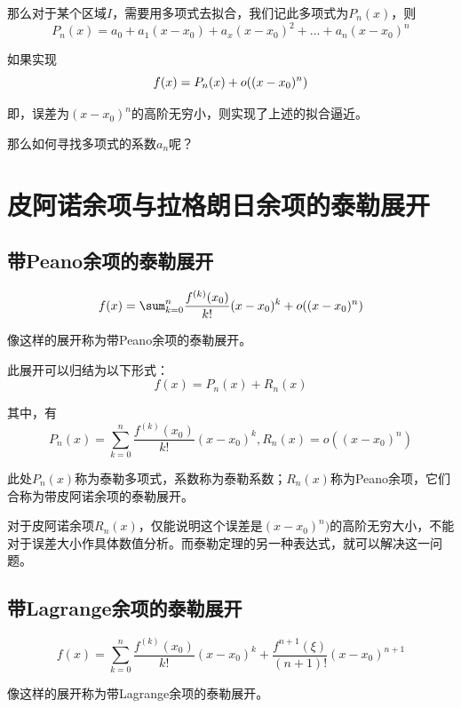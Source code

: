 那么对于某个区域$I$，需要用多项式去拟合，我们记此多项式为$P_n(x)$，则
\begin{equation}
	P_n(x)=a_0+a_1(x-x_0)+a_x(x-x_0)^2+...+a_n(x-x_0)^n\label{eq:5.2}
\end{equation}

如果实现
\begin{equation*}
	f(x)=P_n(x)+o\qty((x-x_0)^n)
\end{equation*}

即，误差为$(x-x_0)^n$的高阶无穷小，则实现了上述的拟合逼近。

那么如何寻找多项式的系数$a_n$呢？

\section{皮阿诺余项与拉格朗日余项的泰勒展开}

\subsection{带Peano余项的泰勒展开}
\begin{definition}
	\begin{equation}
		f(x)=\sum_{k=0}^n\frac{f^{(k)}(x_0)}{k!}(x-x_0)^k+o\qty((x-x_0)^n)\label{eq:5.3}
	\end{equation}

    像这样的展开称为带Peano余项的泰勒展开。
\end{definition}

此展开可以归结为以下形式：
$$
	f(x)=P_n(x)+R_n(x)
$$

其中，有
$$
P_n(x)=\sum\limits_{k=0}^n\frac{f^{(k)}(x_0)}{k!}(x-x_0)^k,R_n(x)=o((x-x_0)^n)
$$

此处$P_n(x)$称为泰勒多项式，系数称为泰勒系数；$R_n(x)$称为Peano余项，它们合称为带皮阿诺余项的泰勒展开。

\begin{remark}
	对于皮阿诺余项$R_n(x)$，仅能说明这个误差是$(x-x_0)^n)$的高阶无穷大小，不能对于误差大小作具体数值分析。而泰勒定理的另一种表达式，就可以解决这一问题。
\end{remark}

\subsection{带Lagrange余项的泰勒展开}\label{sec:5.2.2}

\begin{definition}
	\begin{equation}
		f(x)=\sum_{k=0}^n\frac{f^{(k)}(x_0)}{k!}(x-x_0)^k+\frac{f^{n+1}(\xi)}{(n+1)!}(x-x_0)^{n+1}\label{eq:5.4}
	\end{equation}

    像这样的展开称为带Lagrange余项的泰勒展开。
\end{definition}

